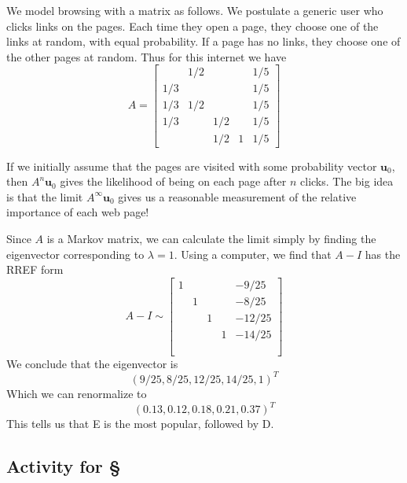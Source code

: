 \documentclass[11pt,oneside]{amsbook}
\theoremstyle{definition}
\theoremstyle{plain}
\theoremstyle{definition}
\theoremstyle{remark}
\numberwithin{equation}{section}
\numberwithin{figure}{section}
\begin{document}
We model browsing with a matrix as follows. We postulate a generic user who clicks links on the pages. Each time they open a page, they choose one of the links at random, with equal probability. If a page has no links, they choose one of the other pages at random. Thus for this internet we have
\[A=\begin{bmatrix}
    &1/2&&&1/5\\
    1/3&&&&1/5\\
    1/3&1/2&&&1/5\\
    1/3&&1/2&&1/5\\
    &&1/2&1&1/5
  \end{bmatrix}
\]

If we initially assume that the pages are visited with some probability vector $\mathbf{u}_0$, then $A^n\mathbf{u}_0$ gives the likelihood of being on each page after $n$ clicks. The big idea is that the limit $A^\infty\mathbf{u}_0$ gives us a reasonable measurement of the relative importance of each web page!

Since $A$ is a Markov matrix, we can calculate the limit simply by finding the eigenvector corresponding to $\lambda=1$. Using a computer, we find that $A-I$ has the RREF form
\[A-I\sim\begin{bmatrix}
    1&&&&-9/25\\
    &1&&&-8/25\\
    &&1&&-12/25\\
    &&&1&-14/25\\
    \phantom{1}
  \end{bmatrix}
\]
We conclude that the eigenvector is
\[(9/25,8/25,12/25,14/25,1)^T
\]
Which we can renormalize to
\[(0.13,0.12,0.18,0.21,0.37)^T
\]
This tells us that E is the most popular, followed by D.

\newpage
\subsection*{Activity for \S \thesection}
\end{document}
